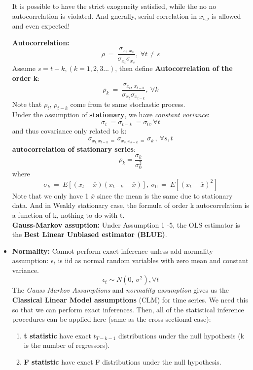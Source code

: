 \documentclass[12pt]{article}
\begin{document}
\begin{itemize}
It is possible to have the strict exogeneity satisfied, while the no no autocorrelation is violated. And gnerally, serial correlation in $x_{t,j}$ is allowed and even expected! 


\textbf{Autocorrelation:}
\begin{equation}
\rho\ =\ \frac{\sigma_{x_t,x_s}}{\sigma_{x_t}\sigma_{x_s}},\ \forall t\ne s
\end{equation}
Assume $s = t - k, (k = 1,2,3 ...)$, then define \textbf{Autocorrelation of the order k}:
\begin{equation}
\rho_k\ =\ \frac{\sigma_{x_t,\ x_{t-k}}}{\sigma_{x_t}\sigma_{x_{t-k}}},\ \forall k
\end{equation}
Note that $\rho_t$, $\rho_{t-k}$ come from te same stochastic process. 
\\

Under the assumption of \textbf{stationary}, we have \textit{constant variance}:
\begin{equation}
\sigma_t\ = \sigma_{t-k}\ = \sigma_0, \forall t
\end{equation}
and thus covariance only related to k:
\begin{equation}
\sigma_{x_{t,}x_{t-k}\ =\ }\sigma_{x_{s,}x_{s-k}\ =\ }\sigma_{k\ },\ \forall s,t
\end{equation}
\textbf{autocorrelation of stationary series}:
\begin{equation}
\rho_k=\frac{\sigma_k}{\sigma_0^2}
\end{equation}
where $$\sigma_k\ =\ E\left[\left(x_t-\overline{x}\right)\left(x_{t-k}-\overline{x}\right)\right],\ \sigma_0\ =\ E\left[\left(x_t-\overline{x}\right)^2\right]$$
Note that we only have 1 $\overline{x}$ since the mean is the same due to stationary data. And in Weakly stationary case, the formula of order k autocorrelation is a function of k, nothing to do with t.
\\

\noindent
\textbf{Gauss-Markov assuption: }Under Assumption 1 -5, the OLS estimator is the \textbf{Best Linear Unbiased estimator (BLUE)}.
\\

\item \textbf{Normality:}
Cannot perform exact inference unless add normality assumption:
$\epsilon_t$ is iid as normal random variables with zero mean and constant variance.
$$
\epsilon_t \sim N\left(0,\ \sigma^2\right), \forall t
$$
The \textit{Gauss Markov Assumptions} and \textit{normality assumption} gives us the \textbf{Classical Linear Model assumptions} (CLM) for time series. We need this so that we can perform exact inferences. Then, all of the statistical inference procedures can be applied here (same as the cross sectional case):
\begin{enumerate}
  \item \textbf{t statistic} have exact \textbf{$t_{T-k-1}$} distributions under the null hypothesis (k is the number of regressors).
  \item \textbf{F statistic} have exact F distributions under the null hypothesis.
\end{enumerate}
\\

\end{itemize}
\end{document}

